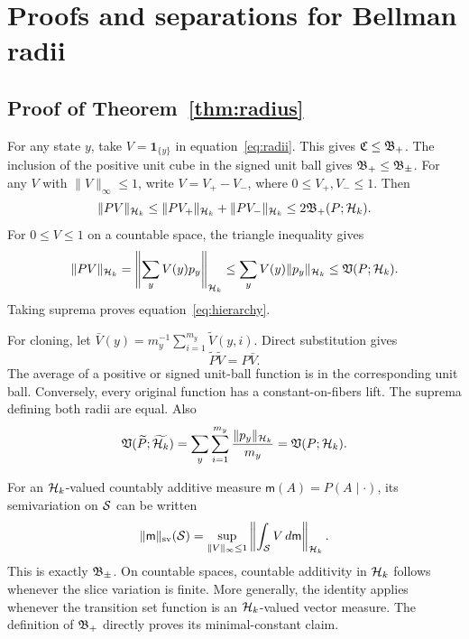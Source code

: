 \section{Proofs and separations for Bellman radii}
\label{app:radius}

\subsection{Proof of Theorem~\ref{thm:radius}}

For any state $y$, take $V=\mathbf1_{\{y\}}$ in
equation~\eqref{eq:radii}. This gives $\mathfrak C\leq\mathfrak B_{+}$. The inclusion of the
positive unit cube in the signed unit ball gives $\mathfrak B_{+}\leq\mathfrak B_{\pm}$.
For any $V$ with $\|V\|_\infty\leq1$, write $V=V_+-V_-$, where
$0\leq V_+,V_-\leq1$. Then
\begin{equation}
 \|PV\|_{\mathcal H_k}\leq\|PV_+\|_{\mathcal H_k}+\|PV_-\|_{\mathcal H_k}
 \leq2\mathfrak B_{+}(P;\mathcal H_k).
\end{equation}
For $0\leq V\leq1$ on a countable space, the triangle inequality gives
\begin{equation}
 \|PV\|_{\mathcal H_k}
 =\left\|\sum_yV(y)p_y\right\|_{\mathcal H_k}
 \leq\sum_yV(y)\|p_y\|_{\mathcal H_k}
 \leq\mathfrak V(P;\mathcal H_k).
\end{equation}
Taking suprema proves equation~\eqref{eq:hierarchy}.

For cloning, let
$\bar V(y)=m_y^{-1}\sum_{i=1}^{m_y}\widetilde V(y,i)$. Direct substitution gives
\begin{equation}
 \widetilde P\widetilde V=P\bar V.
 \label{eq:average-value}
\end{equation}
The average of a positive or signed unit-ball function is in the corresponding
unit ball. Conversely, every original function has a constant-on-fibers lift.
The suprema defining both radii are equal. Also
\begin{equation}
 \mathfrak V(\widetilde P;\widetilde{\mathcal H_k})
 =\sum_y\sum_{i=1}^{m_y}\frac{\|p_y\|_{\mathcal H_k}}{m_y}
 =\mathfrak V(P;\mathcal H_k).
\end{equation}

For an $\mathcal H_k$-valued countably additive measure
$\mathsf m(A)=P(A\mid\cdot)$, its semivariation on $\mathcal S$ can be written
\begin{equation}
 \|\mathsf m\|_{\mathrm{sv}}(\mathcal S)
 =\sup_{\|V\|_\infty\leq1}
 \left\|\int_{\mathcal S}V\,d\mathsf m\right\|_{\mathcal H_k}.
\end{equation}
This is exactly $\mathfrak B_{\pm}$. On countable spaces, countable additivity in $\mathcal H_k$ follows
whenever the slice variation is finite. More generally, the identity applies
whenever the transition set function is an $\mathcal H_k$-valued vector measure. The
definition of $\mathfrak B_{+}$ directly proves its minimal-constant claim.

